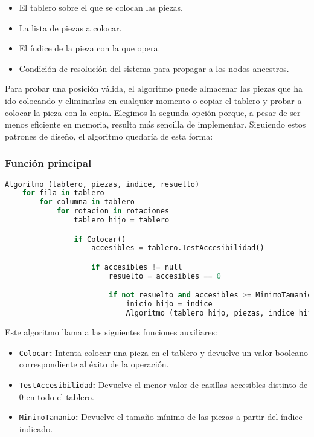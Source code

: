 \begin{itemize}
	\item El tablero sobre el que se colocan las piezas.
	\item La lista de piezas a colocar.
	\item El índice de la pieza con la que opera.
	\item Condición de resolución del sistema para propagar a los nodos ancestros.
\end{itemize}

Para probar una posición válida, el algoritmo puede almacenar las piezas que ha ido colocando y eliminarlas en cualquier momento o copiar el tablero y probar a colocar la pieza con la copia.
Elegimos la segunda opción porque, a pesar de ser menos eficiente en memoria, resulta más sencilla de implementar.
Siguiendo estos patrones de diseño, el algoritmo quedaría de esta forma:

\subsubsection{Función principal}

\begin{lstlisting}[language=Python]
Algoritmo (tablero, piezas, indice, resuelto)
	for fila in tablero
		for columna in tablero
			for rotacion in rotaciones
				tablero_hijo = tablero

				if Colocar()
					accesibles = tablero.TestAccesibilidad()

					if accesibles != null
						resuelto = accesibles == 0

						if not resuelto and accesibles >= MinimoTamanio(piezas, indice+1)
							inicio_hijo = indice
							Algoritmo (tablero_hijo, piezas, indice_hijo, resuelto)
\end{lstlisting}

Este algoritmo llama a las siguientes funciones auxiliares:

\begin{itemize}
	\item\texttt{Colocar}\textbf{:} Intenta colocar una pieza en el tablero y devuelve un valor booleano correspondiente al éxito de la operación.
	\item\texttt{TestAccesibilidad}\textbf{:} Devuelve el menor valor de casillas accesibles distinto de $0$ en todo el tablero.
	\item\texttt{MinimoTamanio}\textbf{:} Devuelve el tamaño mínimo de las piezas a partir del índice indicado.
\end{itemize}


